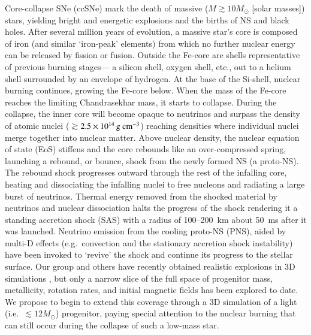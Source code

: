 Core-collapse SNe (ccSNe) mark the death of massive ($M \gtrsim 10
M_{\odot}$ [solar masses]) stars, yielding bright and energetic
explosions and the births of NS and black holes.  After
several million years of evolution, a massive star's core is composed
of iron (and similar `iron-peak' elements) from which no further
nuclear energy can be released by fission or fusion.  Outside the
Fe-core are shells representative of previous burning stages--- a
silicon shell, oxygen shell, etc., out to a helium shell surrounded by
an envelope of hydrogen.  At the base of the Si-shell, nuclear burning
continues, growing the Fe-core below.  When the mass of the Fe-core
reaches the limiting Chandrasekhar mass, it starts to collapse.
During the collapse, the inner core will become opaque to neutrinos
and surpass the density of atomic nuclei
($\gtrsim$$2.5\times10^{14}\,{\mathrm{g~cm^{-3}}}$) reaching densities where
individual nuclei merge together into nuclear matter.  Above nuclear
density, the nuclear equation of state (EoS) stiffens and the core
rebounds like an over-compressed spring, launching a rebound, or
bounce, shock from the newly formed NS (a proto-NS).  The
rebound shock progresses outward through the rest of the infalling
core, heating and dissociating the infalling nuclei to free nucleons
and radiating a large burst of neutrinos. Thermal energy removed from
the shocked material by neutrinos and nuclear dissociation halts the
progress of the shock rendering it a standing accretion shock (SAS)
with a radius of 100--200~km about 50~ms after it was
launched. Neutrino emission from the cooling proto-NS (PNS),
aided by multi-D effects (e.g.\ convection and the stationary
accretion shock instability) have been invoked to `revive' the shock
and continue its progress to the stellar surface.  Our group and
others have recently obtained realistic explosions in
3D simulations \cite{lentzetal2015,melson}, but only a
narrow slice of the full space of progenitor mass, metallicity,
rotation rates, and initial magnetic fields has been explored to
date. We propose to begin to extend this coverage through a 3D
simulation of a light (i.e.\ $\lesssim 12 M_{\odot}$) progenitor, paying
special attention to the nuclear burning that can still occur during
the collapse of such a low-mass star.
